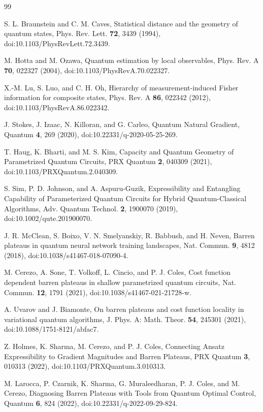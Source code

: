 \documentclass[aps,prx,reprint,superscriptaddress,nofootinbib,longbibliography]{revtex4-2}
\begin{document}
\begin{thebibliography}{99}

S. L. Braunstein and C. M. Caves,
Statistical distance and the geometry of quantum states,
Phys. Rev. Lett. \textbf{72}, 3439 (1994),
doi:10.1103/PhysRevLett.72.3439.

M. Hotta and M. Ozawa,
Quantum estimation by local observables,
Phys. Rev. A \textbf{70}, 022327 (2004),
doi:10.1103/PhysRevA.70.022327.

X.-M. Lu, S. Luo, and C. H. Oh,
Hierarchy of measurement-induced Fisher information for composite states,
Phys. Rev. A \textbf{86}, 022342 (2012),
doi:10.1103/PhysRevA.86.022342.

J. Stokes, J. Izaac, N. Killoran, and G. Carleo,
Quantum Natural Gradient,
Quantum \textbf{4}, 269 (2020),
doi:10.22331/q-2020-05-25-269.

T. Haug, K. Bharti, and M. S. Kim,
Capacity and Quantum Geometry of Parametrized Quantum Circuits,
PRX Quantum \textbf{2}, 040309 (2021),
doi:10.1103/PRXQuantum.2.040309.

S. Sim, P. D. Johnson, and A. Aspuru-Guzik,
Expressibility and Entangling Capability of Parameterized Quantum Circuits for Hybrid Quantum-Classical Algorithms,
Adv. Quantum Technol. \textbf{2}, 1900070 (2019),
doi:10.1002/qute.201900070.

J. R. McClean, S. Boixo, V. N. Smelyanskiy, R. Babbush, and H. Neven,
Barren plateaus in quantum neural network training landscapes,
Nat. Commun. \textbf{9}, 4812 (2018),
doi:10.1038/s41467-018-07090-4.

M. Cerezo, A. Sone, T. Volkoff, L. Cincio, and P. J. Coles,
Cost function dependent barren plateaus in shallow parametrized quantum circuits,
Nat. Commun. \textbf{12}, 1791 (2021),
doi:10.1038/s41467-021-21728-w.

A. Uvarov and J. Biamonte,
On barren plateaus and cost function locality in variational quantum algorithms,
J. Phys. A: Math. Theor. \textbf{54}, 245301 (2021),
doi:10.1088/1751-8121/abfac7.

Z. Holmes, K. Sharma, M. Cerezo, and P. J. Coles,
Connecting Ansatz Expressibility to Gradient Magnitudes and Barren Plateaus,
PRX Quantum \textbf{3}, 010313 (2022),
doi:10.1103/PRXQuantum.3.010313.

M. Larocca, P. Czarnik, K. Sharma, G. Muraleedharan, P. J. Coles, and M. Cerezo,
Diagnosing Barren Plateaus with Tools from Quantum Optimal Control,
Quantum \textbf{6}, 824 (2022),
doi:10.22331/q-2022-09-29-824.


\end{thebibliography}
\end{document}
